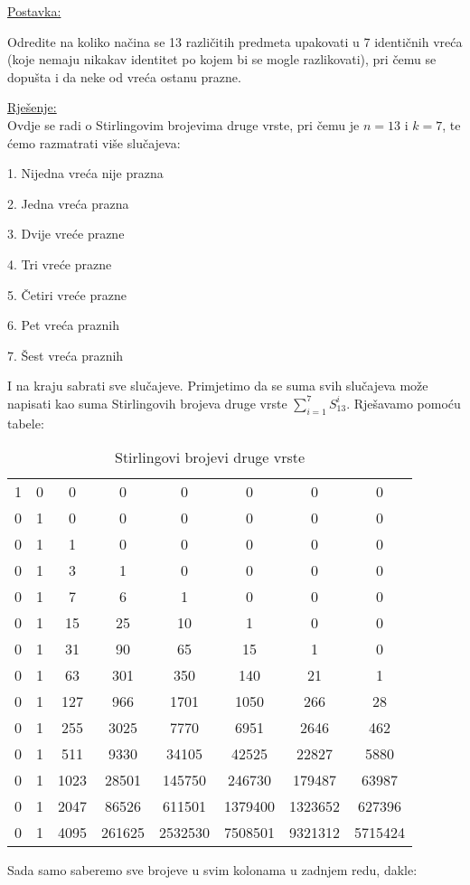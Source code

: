 \documentclass[12pt]{article}
\begin{document}
\underline{Postavka:}

Odredite na koliko načina se 13 različitih predmeta upakovati u 7 identičnih vreća (koje nemaju nikakav identitet po kojem bi se mogle razlikovati), pri čemu se dopušta i da neke od vreća ostanu prazne.

\underline{Rješenje:}\\

Ovdje se radi o Stirlingovim brojevima druge vrste, pri čemu je $n = 13$ i $k = 7$, te ćemo razmatrati više slučajeva:

\begin{center}
1. Nijedna vreća nije prazna

2. Jedna vreća prazna 

3. Dvije vreće prazne

4. Tri vreće prazne

5. Četiri vreće prazne

6. Pet vreća praznih

7. Šest vreća praznih
\end{center}

I na kraju sabrati sve slučajeve. Primjetimo da se suma svih slučajeva može napisati kao suma Stirlingovih brojeva druge vrste $\sum_{i=1}^7 S_{13}^i$. Rješavamo pomoću tabele:

\begin{table}[]
\centering
\caption{Stirlingovi brojevi druge vrste}
\label{Tabela1}
\begin{tabular}{@{}cccccccc@{}}
1 & 0 & 0    & 0      & 0       & 0       & 0       & 0       \\
0 & 1 & 0    & 0      & 0       & 0       & 0       & 0       \\
0 & 1 & 1    & 0      & 0       & 0       & 0       & 0       \\
0 & 1 & 3    & 1      & 0       & 0       & 0       & 0       \\
0 & 1 & 7    & 6      & 1       & 0       & 0       & 0       \\
0 & 1 & 15   & 25     & 10      & 1       & 0       & 0       \\
0 & 1 & 31   & 90     & 65      & 15      & 1       & 0       \\
0 & 1 & 63   & 301    & 350     & 140     & 21      & 1       \\
0 & 1 & 127  & 966    & 1701    & 1050    & 266     & 28      \\
0 & 1 & 255  & 3025   & 7770    & 6951    & 2646    & 462     \\
0 & 1 & 511  & 9330   & 34105   & 42525   & 22827   & 5880    \\
0 & 1 & 1023 & 28501  & 145750  & 246730  & 179487  & 63987   \\
0 & 1 & 2047 & 86526  & 611501  & 1379400 & 1323652 & 627396  \\
0 & 1 & 4095 & 261625 & 2532530 & 7508501 & 9321312 & 5715424
\end{tabular}
\end{table}
\newpage
Sada samo saberemo sve brojeve u svim kolonama u zadnjem redu, dakle:
\end{document}

